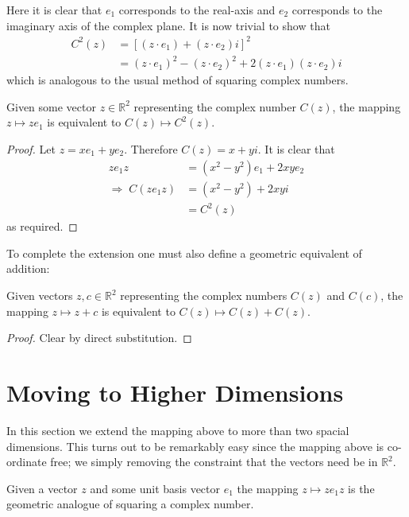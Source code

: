 Here it is clear that $e_1$ corresponds to the real-axis and $e_2$ 
corresponds to the imaginary axis of the complex plane.
It is now trivial to show that
\begin{align*}
C^2(z) &= [(z \cdot e_1) + (z \cdot e_2)i]^2 \\
       &= (z \cdot e_1)^2 - (z \cdot e_2)^2 + 2(z \cdot e_1)(z \cdot e_2)i
\end{align*}
which is analogous to the usual method of squaring complex numbers.

\begin{lemma}
Given some vector $z \in \mathbb{R}^2$ representing the complex number
$C(z)$, the mapping $z \mapsto ze_1$ is equivalent to $C(z) \mapsto C^2(z)$.
\end{lemma}
\begin{proof}
Let $z = xe_1 + ye_2$. Therefore $C(z) = x + yi$. It is clear that
\begin{align*}
ze_1z &= (x^2 - y^2) e_1 + 2xye_2 \\
\Rightarrow\;C(ze_1z) &= (x^2 - y^2) + 2xyi\\
        &= C^2(z)
\end{align*}
as required.
\end{proof}

To complete the extension one must also define a geometric equivalent of
addition:
\begin{lemma}
Given vectors $z, c \in \mathbb{R}^2$ representing the complex numbers
$C(z)$ and $C(c)$, the mapping $z \mapsto z + c$ is equivalent to 
$C(z) \mapsto C(z) + C(z)$.
\end{lemma}
\begin{proof}
Clear by direct substitution.
\end{proof}

\section{Moving to Higher Dimensions}

In this section we extend the mapping above to more than two spacial dimensions.
This turns out to be remarkably easy since the mapping above is co-ordinate free;
we simply removing the constraint that the vectors need be in $\mathbb{R}^2$.

\begin{definition}
Given a vector $z$ and some unit basis vector $e_1$ the mapping
$z \mapsto ze_1z$ is the geometric analogue of squaring a complex number.
\end{definition}

